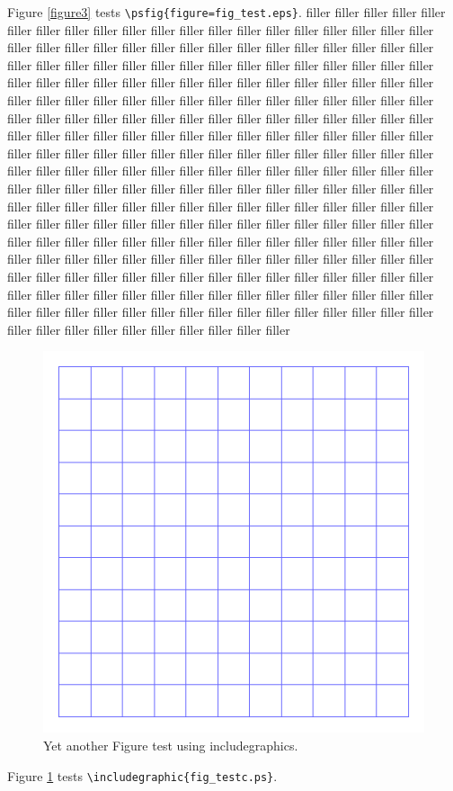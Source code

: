 \documentclass{article}
\begin{document}
Figure \ref{figure3} tests \verb#\psfig{figure=fig_test.eps}#.
filler filler filler filler filler filler filler filler filler
filler filler filler filler filler filler filler filler filler
filler filler filler filler filler filler filler filler filler
filler filler filler filler filler filler filler filler filler
filler filler filler filler filler filler filler filler filler
filler filler filler filler filler filler filler filler filler
filler filler filler filler filler filler filler filler filler
filler filler filler filler filler filler filler filler filler
filler filler filler filler filler filler filler filler filler
filler filler filler filler filler filler filler filler filler
filler filler filler filler filler filler filler filler filler
filler filler filler filler filler filler filler filler filler
filler filler filler filler filler filler filler filler filler
filler filler filler filler filler filler filler filler filler
filler filler filler filler filler filler filler filler filler
filler filler filler filler filler filler filler filler filler
filler filler filler filler filler filler filler filler filler
filler filler filler filler filler filler filler filler filler
filler filler filler filler filler filler filler filler filler
filler filler filler filler filler filler filler filler filler
filler filler filler filler filler filler filler filler filler
filler filler filler filler filler filler filler filler filler
filler filler filler filler filler filler filler filler filler
filler filler filler filler filler filler filler filler filler
filler filler filler filler filler filler filler filler filler
filler filler filler filler filler filler filler filler filler
filler filler filler filler filler filler filler filler filler
filler filler filler filler filler filler filler filler filler
filler filler filler filler filler filler filler filler filler
filler filler filler filler filler filler filler filler filler

\begin{figure}
\includegraphics{fig_testd}
\caption{Yet another Figure test using includegraphics.} 
\label{figure4}
\end{figure}

Figure  \ref{figure4} tests \verb#\includegraphic{fig_testc.ps}#.  
\end{document}
